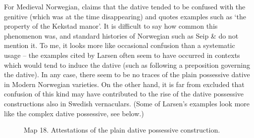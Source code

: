{{%

For Medieval Norwegian, \citet{Larsen1895} claims that the dative tended to be confused with the genitive (which was at the time disappearing) and quotes examples such as  ‘the property of the Kekstad manor’. It is difficult to say how common this phenomenon was, and standard histories of Norwegian such as Seip \& \citet{Saltveit1971} do not mention it. To me, it looks more like occasional confusion than a systematic usage – the examples cited by Larsen often seem to have occurred in contexts which would tend to induce the dative (such as following a preposition governing the dative). In any case, there seem to be no traces of the plain possessive dative in Modern Norwegian varieties. On the other hand, it is far from excluded that confusion of this kind may have contributed to the rise of the dative possessive constructions also in Swedish vernaculars. (Some of Larsen’s examples look more like the complex dative possessive, see below.)




\begin{figure}[h]

\begin{minipage}{4.23958in}

\label{bkm:Ref154557005}Map 18. Attestations of the plain dative possessive construction.


\end{minipage}

\end{figure}



\begin{figure}[h]

\begin{minipage}{3.9625in}


\end{minipage}
\end{figure}}}
